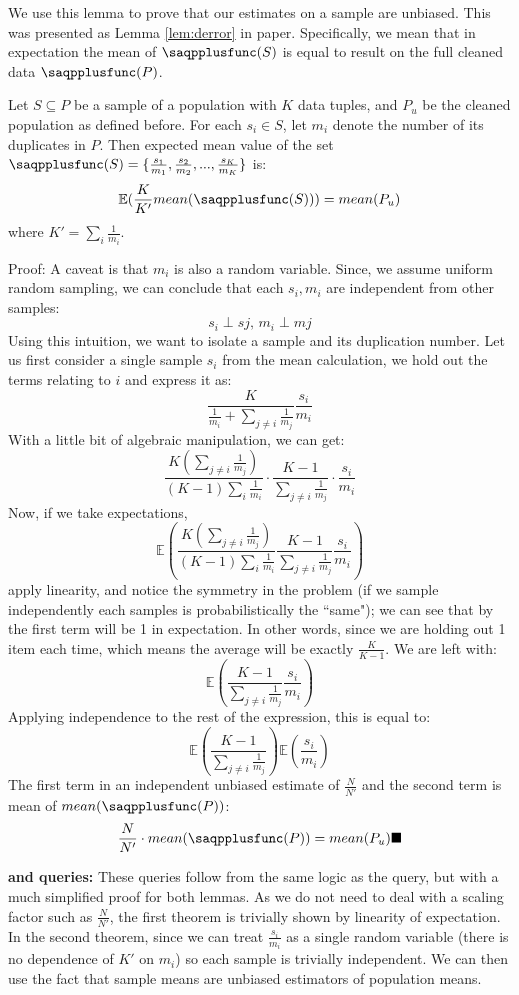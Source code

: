We use this lemma to prove that our estimates on a sample are unbiased.
This was presented as Lemma \ref{lem:derror} in paper.
Specifically, we mean that in expectation the mean of $\saqpplusfunc(S)$ is equal to result on the full cleaned data $\saqpplusfunc(P)$.
\begin{lemma}
Let $S \subseteq P$ be a sample of a population with $K$ data tuples, and $P_{u}$ be the cleaned population as defined before.
For each $s_{i}\in S$, let $m_i$ denote the number of its duplicates in $P$.
Then expected mean value of the set $\saqpplusfunc(S)=\{\frac{s_{1}}{m_{1}},\frac{s_{2}}{m_{2}},...,\frac{s_{K}}{m_{K}}\}$ is:
\[
\mathbb{E}(\frac{K}{K'}mean(\saqpplusfunc(S))) = mean(P_{u})
\]
where $K'=\sum_i\frac{1}{m_i}$.
\end{lemma}
Proof: A caveat is that $m_i$ is also a random variable.
Since, we assume uniform random sampling, we can conclude that each $s_i,m_i$ are independent from other samples:
\[
s_{i} \perp s{j}\text{, } m_{i} \perp m{j}
\]
Using this intuition, we want to isolate a sample and its duplication number.
Let us first consider a single sample $s_{i}$ from the mean calculation,
we hold out the terms relating to $i$ and express it as:
\[
\frac{K}{\frac{1}{m_i}+ \sum_{j\ne i}\frac{1}{m_j}} \frac{s_i}{m_i}
\]
With a little bit of algebraic manipulation, we can get:
\[
\frac{K(\sum_{j\ne i}\frac{1}{m_j})}{(K-1)\sum_i\frac{1}{m_i}}\cdot\frac{K-1}{\sum_{j\ne i}\frac{1}{m_j}}\cdot\frac{s_i}{m_i}
\]
Now, if we take expectations,
\[
\mathbb{E}(\frac{K(\sum_{j\ne i}\frac{1}{m_j})}{(K-1)\sum_i\frac{1}{m_i}}\frac{K-1}{\sum_{j\ne i}\frac{1}{m_j}}\frac{s_i}{m_i})
\]
apply linearity, and notice the symmetry in the problem (if we sample independently each samples is probabilistically the ``same");
we can see that by the first term will be 1 in expectation.
In other words, since we are holding out 1 item each time, which means the average will be exactly $\frac{K}{K-1}$.
We are left with:
\[
\mathbb{E}(\frac{K-1}{\sum_{j\ne i}\frac{1}{m_j}}\frac{s_i}{m_i})
\]
Applying independence to the rest of the expression, this is equal to:
\[
\mathbb{E}(\frac{K-1}{\sum_{j\ne i}\frac{1}{m_j}})\mathbb{E}(\frac{s_i}{m_i})
\]
The first term in an independent unbiased estimate of $\frac{N}{N'}$ and the second term is mean of $mean(\saqpplusfunc(P))$:
\[
\frac{N}{N'}\cdot mean(\saqpplusfunc(P)) = mean(P_{u})\blacksquare
\]

{\noindent \bf \sumfunc and \countfunc queries:}
These queries follow from the same logic as the \avgfunc query, but with a much simplified proof for both lemmas.
As we do not need to deal with a scaling factor such as $\frac{N}{N'}$, the first theorem is trivially shown by linearity of expectation.
In the second theorem, since we can treat $\frac{s_i}{m_i}$ as a single random variable (there is no dependence of $K'$ on $m_i$) so each sample
is trivially independent.
We can then use the fact that sample means are unbiased estimators of population means.

